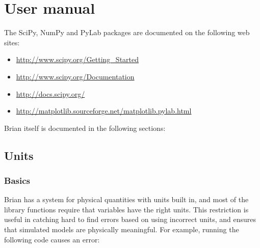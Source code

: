 \documentclass[letterpaper,10pt,english]{manual}
\begin{document}
\hypertarget{user-manual}{}\chapter{User manual}
The SciPy, NumPy and PyLab packages are documented on the following web sites:
\begin{itemize}
\item {} 
\href{http://www.scipy.org/Getting\_Started}{http://www.scipy.org/Getting\_Started}

\item {} 
\href{http://www.scipy.org/Documentation}{http://www.scipy.org/Documentation}

\item {} 
\href{http://docs.scipy.org/}{http://docs.scipy.org/}

\item {} 
\href{http://matplotlib.sourceforge.net/matplotlib.pylab.html}{http://matplotlib.sourceforge.net/matplotlib.pylab.html}

\end{itemize}

Brian itself is documented in the following sections:

\resetcurrentobjects


\section{Units}


\subsection{Basics}

Brian has a system for physical quantities with units built in, and most of the
library functions require that variables have the right units. This restriction
is useful in catching hard to find errors based on using incorrect units, and
ensures that simulated models are physically meaningful. For example, running
the following code causes an error:
\end{document}
